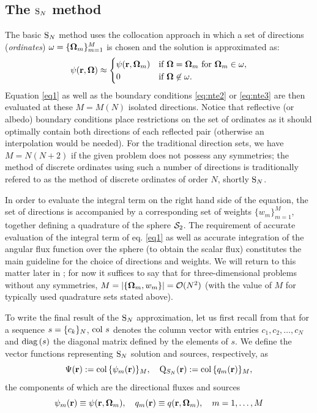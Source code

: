 \subsection{The $\text{S}_{N}$ method}\label{sec:1-SN}
The basic $\text{S}_{N}$ method uses the collocation approach in which a set of directions (\textit{ordinates})
$\omega = \{\mathbf{\Omega}_m\}_{m=1}^{M}$ is chosen and the solution is approximated as:
\begin{equation}\label{eq:sn_approx} 
	\psi(\mathbf{r}, \mathbf{\Omega}) \approx 
		\begin{cases}\displaystyle \psi(\mathbf{r},\mathbf{\Omega}_m) & \mbox{if $\mathbf{\Omega} = \mathbf{\Omega}_m$ for $\mathbf{\Omega}_m \in \omega$},\\ 0 & \mbox{if $\mathbf{\Omega} \not \in \omega$.} \end{cases} 
\end{equation}
Equation \eqref{eq1} as well as the boundary conditions \eqref{eq:nte2} or \eqref{eq:nte3} are then evaluated at these
$M = M(N)$ isolated directions. Notice that reflective (or albedo) boundary conditions place restrictions on the set of
ordinates as it should optimally contain both directions of each reflected pair (otherwise an interpolation would be
needed). For the traditional direction sets, we have $M = N(N+2)$ if the given problem does not possess any symmetries;
the method of discrete ordinates using such a number of directions is traditionally refered to as the method of 
discrete ordinates of order $N$, shortly $\text{S}_{N}$.

In order to evaluate the integral term on the right hand side of the equation, the set of directions is accompanied by a
corresponding set of weights $\{w_m\}_{m=1}^{M}$, together defining a quadrature of the sphere $\mathcal{S}_2$. The
requirement of accurate evaluation of the integral term of eq.
\eqref{eq1} as well as accurate integration of the angular flux function over the sphere (to obtain the scalar flux)
constitutes the main guideline for the choice of directions and weights. We will return to this matter later in 
; for now it suffices to say that for three-dimensional problems without any symmetries, \mbox{$M = \left|\{\mathbf{\Omega}_m, w_m\}\right| = \mathcal{O}(N^2)$} (with the
value of $M$ for typically used quadrature sets stated above).

To write  the final result of the $\text{S}_{N}$ approximation, let us first recall from  that for a sequence
$s = \{c_k\}_N$, $\operatorname{col\,} s$ denotes the column vector with entries $c_1,c_2,\ldots,c_N$ and $\operatorname{diag\,}(s)$ the 
diagonal matrix defined by the elements of $s$. 
We define the vector functions representing $\text{S}_{N}$ solution and sources, respectively, as 
\begin{equation}\label{eq:sn_vars}
\Psi(\mathbf{r}) := \operatorname{col\,}\{\psi_m(\mathbf{r})\}_{M},\quad
\mathrm{Q}_{S_N}(\mathbf{r}) := \operatorname{col\,}\{q_m(\mathbf{r})\}_{M},
\end{equation}
the components of which are the directional fluxes and sources
\begin{equation}\label{eq:sn_vecs}
\psi_m(\mathbf{r}) \equiv \psi(\mathbf{r},\mathbf{\Omega}_m), \quad q_m(\mathbf{r}) \equiv
q(\mathbf{r},\mathbf{\Omega}_m),\quad m = 1,\ldots, M	
\end{equation}

